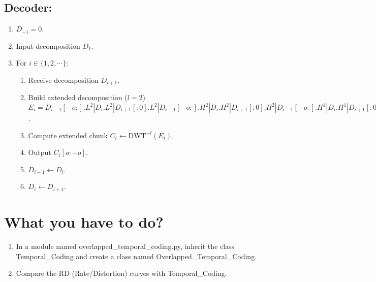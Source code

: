 
\subsection*{Decoder:}
\begin{enumerate}
\item $D_{-1}=0$.
\item Input decomposition $D_1$.
\item For $i\in\{1,2,\cdots\}$:
  \begin{enumerate}
  \item Receive decomposition $D_{i+1}$.
  \item Build extended decomposition ($l=2$) $E_i =
    D_{i-1}[-o:].L^2|D_i.L^2|D_{i+1}[:0].L^2|D_{i-1}[-o:].H^2|D_i.H^2|D_{i+1}[:0].H^2|D_{i-1}[-o:].H^1|D_i.H^1|D_{i+1}[:0].H^1$.
  \item Compute extended chunk $C_i\leftarrow\text{DWT}^{-l}(E_i)$.
  \item Output $C_i[o:-o]$.
  \item $D_{i-1} \leftarrow D_i$.
  \item $D_i \leftarrow D_{i+1}$.
  \end{enumerate}
\end{enumerate}


\section{What you have to do?}

\begin{enumerate}
\item In a module named overlapped\_temporal\_coding.py, inherit
  the class Temporal\_Coding and create a class named
  Overlapped\_Temporal\_Coding.
\item Compare the RD (Rate/Distortion) curves with Temporal\_Coding.
\end{enumerate}

